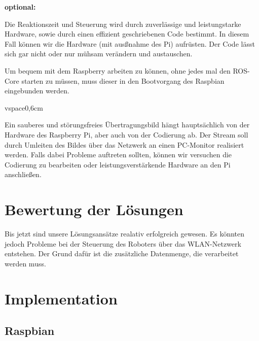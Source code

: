 \documentclass[12pt]{article}
\begin{document}

{\bf optional:}

Die Reaktionszeit 
und Steuerung %
wird durch zuverlässige und leistungstarke Hardware, sowie durch einen effizient geschriebenen Code bestimmt. In diesem Fall können wir die Hardware (mit ausßnahme des Pi) aufrüsten. Der Code lässt sich gar nicht oder nur mühsam verändern und austauschen.


Um bequem mit dem Raspberry arbeiten zu können, ohne jedes mal den ROS-Core starten zu müssen, muss dieser in den Bootvorgang des Raspbian eingebunden werden.



vspace{0,6cm}

Ein sauberes und störungsfreies Übertragungsbild hängt hauptsächlich von der Hardware des Raspberry Pi, aber auch von der Codierung ab. Der Stream soll durch  Umleiten des Bildes über das Netzwerk an einen PC-Monitor realisiert werden. Falls dabei Probleme auftreten sollten, können wir versuchen die Codierung zu bearbeiten oder leistungsverstärkende Hardware an den Pi anschließen.




\section{Bewertung der Lösungen}

Bis jetzt sind unsere Lösungsansätze realativ erfolgreich gewesen. Es könnten jedoch Probleme bei der Steuerung des Roboters über das WLAN-Netzwerk entstehen. Der Grund dafür ist die zusätzliche Datenmenge, die verarbeitet werden muss. 

\section{Implementation}

\subsection{Raspbian}
\end{document}
